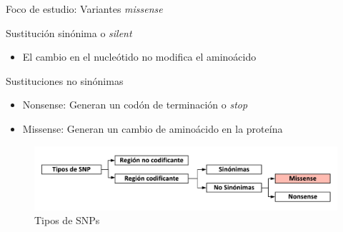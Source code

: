 \documentclass[
  spanish,
  ignorenonframetext,
]{beamer}
\providecommand{\tightlist}{%
  \setlength{\itemsep}{0pt}\setlength{\parskip}{0pt}}
\begin{document}
\begin{frame}{Foco de estudio: Variantes \textit{missense}}
\protect\hypertarget{foco-de-estudio-variantes}{}

\begin{block}{Sustitución sinónima o \textit{silent}}

\begin{itemize}
\tightlist
\item
  El cambio en el nucleótido no modifica el aminoácido
\end{itemize}

\end{block}

\begin{block}{Sustituciones no sinónimas}

\begin{itemize}
\tightlist
\item
  Nonsense: Generan un codón de terminación o \textit{stop}
\item
  Missense: Generan un cambio de aminoácido en la proteína
\end{itemize}

\end{block}

\begin{figure}
\centering
\includegraphics{snp_types.pdf}
\caption{Tipos de SNPs}
\end{figure}

\end{frame}
\end{document}
